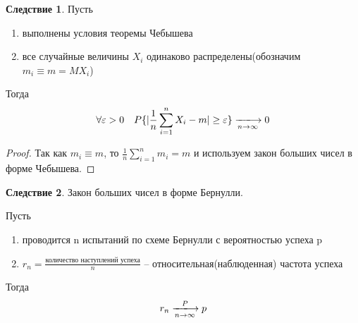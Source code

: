 \documentclass[a4paper, 12pt]{article}
\theoremstyle{definition}
\theoremstyle{leads}
\newtheorem{leads}{Следствие}
\theoremstyle{example}
\begin{document}
\begin{leads}
	Пусть 
	\begin{enumerate}
		\item выполнены условия теоремы Чебышева
		\item все случайные величины $X_i$ одинаково распределены(обозначим $m_i \equiv m = MX_i$)  
	\end{enumerate}
Тогда 
\begin{displaymath}
	\forall \varepsilon > 0 \quad P\{|\frac{1}{n}\sum_{i=1}^{n}X_i - m| \geq \varepsilon \} \xlongrightarrow[n \rightarrow \infty]{} 0
\end{displaymath}
\end{leads}
\begin{proof}
	Так как $m_i \equiv m$, то $\frac{1}{n}\sum_{i=1}^{n} m_i = m$ и используем закон больших чисел в форме Чебышева.
\end{proof}
\begin{leads}
	Закон больших чисел в форме Бернулли.
	
	Пусть 
	\begin{enumerate}
		\item проводится n испытаний по схеме Бернулли с вероятностью успеха p
		\item $r_n = \frac{\text{количество наступлений успеха}}{n}$ -- относительная(наблюденная) частота успеха
	\end{enumerate}
Тогда 
\begin{displaymath}
  r_n \xlongrightarrow[n \rightarrow \infty]{P} p
\end{displaymath}
\end{leads}
\end{document}

